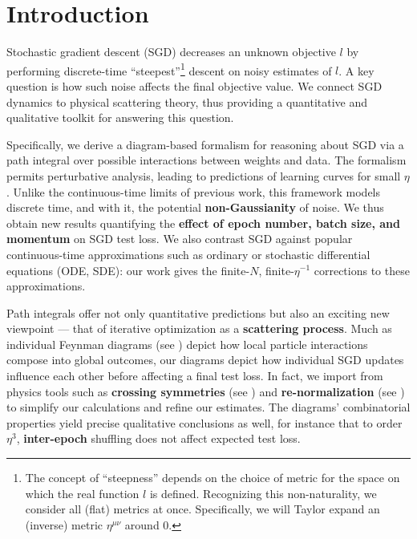 \documentclass{article}
\begin{document}
\section{Introduction}


    Stochastic gradient descent (SGD) decreases an unknown objective $l$ by
    performing discrete-time ``steepest''\footnote{
        The concept of ``steepness'' depends on the choice of metric for the
        space on which the real function $l$ is defined.  Recognizing this
        non-naturality, we consider all (flat) metrics at once.  Specifically,
        we will Taylor expand an (inverse) metric $\eta^{\mu\nu}$ around $0$.
    } descent on noisy estimates of $l$.  A key question is how such noise
    affects the final objective value.  We connect SGD dynamics to physical
    scattering theory, thus providing a quantitative and qualitative toolkit
    for answering this question.


    Specifically, we derive a diagram-based formalism for reasoning about SGD
    via a path integral over possible interactions between weights and data.
    The formalism permits perturbative analysis, leading to predictions of
    learning curves for small $\eta$.  Unlike the continuous-time limits of
    previous work, this framework models discrete time, and with it, the
    potential {\bf non-Gaussianity} of noise.  We thus obtain new results
    quantifying the {\bf effect of epoch number, batch size, and momentum} on
    SGD test loss.  We also contrast SGD against popular continuous-time
    approximations such as ordinary or stochastic differential equations (ODE,
    SDE): our work gives the finite-$N$, finite-$\eta^{-1}$ corrections to 
    these approximations.
    

    Path integrals offer not only quantitative predictions but also an exciting
    new viewpoint --- that of iterative optimization as a {\bf scattering
    process}.  Much as individual Feynman diagrams (see \citet{dy49a}) depict
    how local particle interactions compose into global outcomes, our diagrams
    depict how individual SGD updates influence each other before affecting a
    final test loss.  In fact, we import from physics tools such as {\bf
    crossing symmetries} (see \citet{dy49b}) and {\bf re-normalization} (see
    \citet{ge54}) to simplify our calculations and refine our estimates.  The
    diagrams' combinatorial properties yield precise qualitative conclusions as
    well, for instance that to order $\eta^3$, {\bf inter-epoch} shuffling does
    not affect expected test loss.
\end{document}
